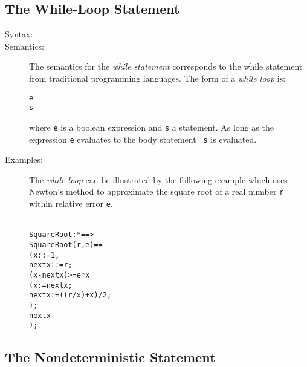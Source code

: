 \documentclass[\pformat,12pt]{article}
\begin{document}
\subsection{The While-Loop Statement}

\begin{description}
\item[Syntax:]
  

\item[Semantics:] The semantics for the {\it while statement} corresponds
  to the while statement from traditional programming languages. The form
  of a {\it while loop\/} is:
  \begin{alltt}
     e 
      s
  \end{alltt}
  where {\tt e} is a boolean expression and {\tt s} a statement. As long as
  the expression {\tt e} evaluates to  the body statement {\tt
    s} is evaluated.

\item[Examples:] The {\it while loop} can be illustrated by the following
  example which uses Newton's method to approximate the square root of
  a real number \texttt{r} within relative error \texttt{e}.
  \begin{alltt}\label{squarerootDef}
  SquareRoot :  *  ==> 
  SquareRoot (r,e) ==
    ( x: := 1,
        nextx: := r;
       (x - nextx) >= e * x 
       ( x := nextx;
         nextx := ((r / x) + x) / 2;
       );
      nextx
    );
  \end{alltt}
\end{description}

\subsection{The Nondeterministic Statement}
\end{document}
